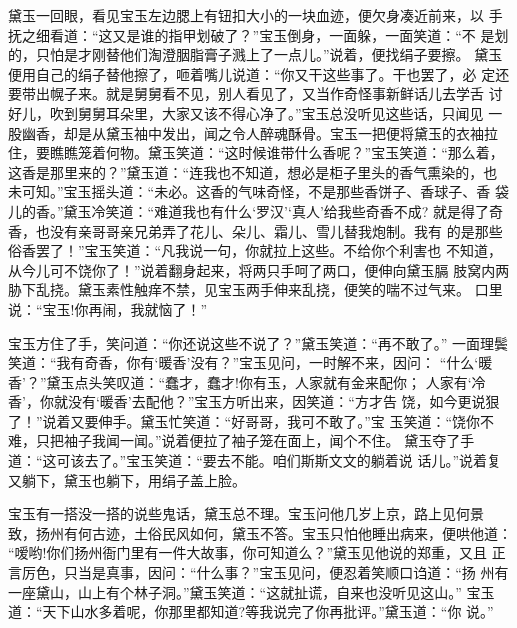 黛玉一回眼，看见宝玉左边腮上有钮扣大小的一块血迹，便欠身凑近前来，以
手抚之细看道：“这又是谁的指甲划破了？”宝玉倒身，一面躲，一面笑道：“不
是划的，只怕是才刚替他们淘澄胭脂膏子溅上了一点儿。”说着，便找绢子要擦。
黛玉便用自己的绢子替他擦了，咂着嘴儿说道：“你又干这些事了。干也罢了，必
定还要带出幌子来。就是舅舅看不见，别人看见了，又当作奇怪事新鲜话儿去学舌
讨好儿，吹到舅舅耳朵里，大家又该不得心净了。”宝玉总没听见这些话，只闻见
一股幽香，却是从黛玉袖中发出，闻之令人醉魂酥骨。宝玉一把便将黛玉的衣袖拉
住，要瞧瞧笼着何物。黛玉笑道：“这时候谁带什么香呢？”宝玉笑道：“那么着，
这香是那里来的？”黛玉道：“连我也不知道，想必是柜子里头的香气熏染的，也
未可知。”宝玉摇头道：“未必。这香的气味奇怪，不是那些香饼子、香球子、香
袋儿的香。”黛玉冷笑道：“难道我也有什么‘罗汉’‘真人’给我些奇香不成?
就是得了奇香，也没有亲哥哥亲兄弟弄了花儿、朵儿、霜儿、雪儿替我炮制。我有
的是那些俗香罢了！”宝玉笑道：“凡我说一句，你就拉上这些。不给你个利害也
不知道，从今儿可不饶你了！”说着翻身起来，将两只手呵了两口，便伸向黛玉膈
肢窝内两胁下乱挠。黛玉素性触痒不禁，见宝玉两手伸来乱挠，便笑的喘不过气来。
口里说：“宝玉!你再闹，我就恼了！”

宝玉方住了手，笑问道：“你还说这些不说了？”黛玉笑道：“再不敢了。”
一面理鬓笑道：“我有奇香，你有‘暖香’没有？”宝玉见问，一时解不来，因问：
“什么‘暖香’？”黛玉点头笑叹道：“蠢才，蠢才!你有玉，人家就有金来配你；
人家有‘冷香’，你就没有‘暖香’去配他？”宝玉方听出来，因笑道：“方才告
饶，如今更说狠了！”说着又要伸手。黛玉忙笑道：“好哥哥，我可不敢了。”宝
玉笑道：“饶你不难，只把袖子我闻一闻。”说着便拉了袖子笼在面上，闻个不住。
黛玉夺了手道：“这可该去了。”宝玉笑道：“要去不能。咱们斯斯文文的躺着说
话儿。”说着复又躺下，黛玉也躺下，用绢子盖上脸。

宝玉有一搭没一搭的说些鬼话，黛玉总不理。宝玉问他几岁上京，路上见何景
致，扬州有何古迹，土俗民风如何，黛玉不答。宝玉只怕他睡出病来，便哄他道：
“嗳哟!你们扬州衙门里有一件大故事，你可知道么？”黛玉见他说的郑重，又且
正言厉色，只当是真事，因问：“什么事？”宝玉见问，便忍着笑顺口诌道：“扬
州有一座黛山，山上有个林子洞。”黛玉笑道：“这就扯谎，自来也没听见这山。”
宝玉道：“天下山水多着呢，你那里都知道?等我说完了你再批评。”黛玉道：“你
说。”

